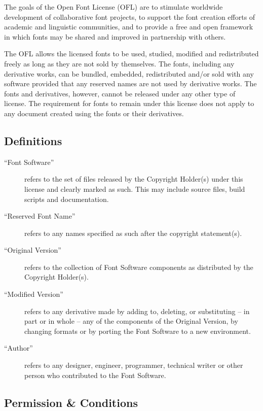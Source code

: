 \documentclass[paper=a4, 10pt]{scrbook}
\begin{document}
The goals of the Open Font License (OFL) are to stimulate worldwide development of collaborative font projects, to support the font creation efforts of academic and linguistic communities, and to provide a free and open framework in which fonts may be shared and improved in partnership with others.

The OFL allows the licensed fonts to be used, studied, modified and redistributed freely as long as they are not sold by themselves. The fonts, including any derivative works, can be bundled, embedded, redistributed and/or sold with any software provided that any reserved names are not used by derivative works. The fonts and derivatives, however, cannot be released under any other type of license. The requirement for fonts to remain under this license does not apply to any document created using the fonts or their derivatives.

\subsection{Definitions}

\begin{description}
	\item[“Font Software”] refers to the set of files released by the Copyright Holder(s) under this license and clearly marked as such. This may include source files, build scripts and documentation.

	\item[“Reserved Font Name”] refers to any names specified as such after the copyright statement(s).

	\item[“Original Version”] refers to the collection of Font Software components as distributed by the Copyright Holder(s).

	\item[“Modified Version”] refers to any derivative made by adding to, deleting, or substituting – in part or in whole – any of the components of the Original Version, by changing formats or by porting the Font Software to a new environment.

	\item[“Author”] refers to any designer, engineer, programmer, technical writer or other person who contributed to the Font Software.
\end{description}

\subsection{Permission \& Conditions}
\end{document}
